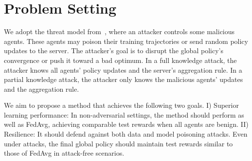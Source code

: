 
\section{Problem Setting}


%
%
%
We adopt the threat model from~\cite{fan2021fault}, where an attacker controls some malicious agents. These agents may poison their training trajectories or send random policy updates to the server. The attacker's goal is to disrupt the global policy’s convergence or push it toward a bad optimum. 
%
In a full knowledge attack, the attacker knows all agents' policy updates and the server's aggregation rule. In a partial knowledge attack, the attacker only knows the malicious agents' updates and the aggregation rule.




We aim to propose a method that achieves the following two goals. I) Superior learning performance: In non-adversarial settings, the method should perform as well as FedAvg, achieving comparable test rewards when all agents are benign. 
II) Resilience: It should defend against both data and model poisoning attacks. Even under attacks, the final global policy should maintain test rewards similar to those of FedAvg in attack-free scenarios.

